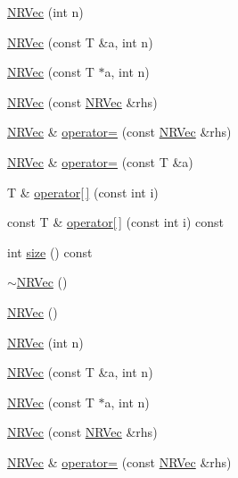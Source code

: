 \begin{DoxyCompactItemize}
\item 
\mbox{\hyperlink{classNR_1_1NRVec_a32e1c3a7b161ae48f90e95f44261c385}{N\+R\+Vec}} (int n)
\item 
\mbox{\hyperlink{classNR_1_1NRVec_a876abf88c99fa23c45098f2f48369ec9}{N\+R\+Vec}} (const T \&a, int n)
\item 
\mbox{\hyperlink{classNR_1_1NRVec_a20980fe6d9976332123225c883fbe67d}{N\+R\+Vec}} (const T $\ast$a, int n)
\item 
\mbox{\hyperlink{classNR_1_1NRVec_a89f4e31b7ca536611076d5ad70f84770}{N\+R\+Vec}} (const \mbox{\hyperlink{classNR_1_1NRVec}{N\+R\+Vec}} \&rhs)
\item 
\mbox{\hyperlink{classNR_1_1NRVec}{N\+R\+Vec}} \& \mbox{\hyperlink{classNR_1_1NRVec_a29999391ce59d89db129830e58ddf6ef}{operator=}} (const \mbox{\hyperlink{classNR_1_1NRVec}{N\+R\+Vec}} \&rhs)
\item 
\mbox{\hyperlink{classNR_1_1NRVec}{N\+R\+Vec}} \& \mbox{\hyperlink{classNR_1_1NRVec_af2d6c1894e28979a9c758a2f103832ee}{operator=}} (const T \&a)
\item 
T \& \mbox{\hyperlink{classNR_1_1NRVec_aa06286b2b6a9a51dd275d17c1b777bed}{operator\mbox{[}$\,$\mbox{]}}} (const int i)
\item 
const T \& \mbox{\hyperlink{classNR_1_1NRVec_a96caa29f8fb313218804268101c95e1a}{operator\mbox{[}$\,$\mbox{]}}} (const int i) const
\item 
int \mbox{\hyperlink{classNR_1_1NRVec_ab0dfb2d7ce74022fa0ce42138f4a224b}{size}} () const
\item 
\mbox{\hyperlink{classNR_1_1NRVec_a7161dfe4a95a73eca56d084c662f8eae}{$\sim$\+N\+R\+Vec}} ()
\item 
\mbox{\hyperlink{classNR_1_1NRVec_a3c549533b11738d9c1320abd0078f5aa}{N\+R\+Vec}} ()
\item 
\mbox{\hyperlink{classNR_1_1NRVec_a32e1c3a7b161ae48f90e95f44261c385}{N\+R\+Vec}} (int n)
\item 
\mbox{\hyperlink{classNR_1_1NRVec_a876abf88c99fa23c45098f2f48369ec9}{N\+R\+Vec}} (const T \&a, int n)
\item 
\mbox{\hyperlink{classNR_1_1NRVec_a20980fe6d9976332123225c883fbe67d}{N\+R\+Vec}} (const T $\ast$a, int n)
\item 
\mbox{\hyperlink{classNR_1_1NRVec_a89f4e31b7ca536611076d5ad70f84770}{N\+R\+Vec}} (const \mbox{\hyperlink{classNR_1_1NRVec}{N\+R\+Vec}} \&rhs)
\item 
\mbox{\hyperlink{classNR_1_1NRVec}{N\+R\+Vec}} \& \mbox{\hyperlink{classNR_1_1NRVec_a29999391ce59d89db129830e58ddf6ef}{operator=}} (const \mbox{\hyperlink{classNR_1_1NRVec}{N\+R\+Vec}} \&rhs)

\end{DoxyCompactItemize}
